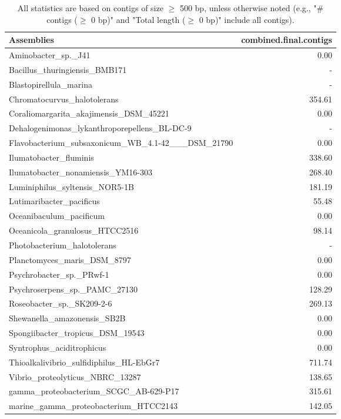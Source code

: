 \documentclass[12pt,a4paper]{article}
\begin{document}
\begin{table}[ht]
\begin{center}
\caption{All statistics are based on contigs of size $\geq$ 500 bp, unless otherwise noted (e.g., "\# contigs ($\geq$ 0 bp)" and "Total length ($\geq$ 0 bp)" include all contigs).}
\begin{tabular}{|l*{1}{|r}|}
\hline
Assemblies & combined.final.contigs \\ \hline
Aminobacter\_sp.\_J41 & 0.00 \\ \hline
Bacillus\_thuringiensis\_BMB171 & - \\ \hline
Blastopirellula\_marina & - \\ \hline
Chromatocurvus\_halotolerans & 354.61 \\ \hline
Coraliomargarita\_akajimensis\_DSM\_45221 & 0.00 \\ \hline
Dehalogenimonas\_lykanthroporepellens\_BL-DC-9 & - \\ \hline
Flavobacterium\_subsaxonicum\_WB\_4.1-42\_\_\_DSM\_21790 & 0.00 \\ \hline
Ilumatobacter\_fluminis & 338.60 \\ \hline
Ilumatobacter\_nonamiensis\_YM16-303 & 268.40 \\ \hline
Luminiphilus\_syltensis\_NOR5-1B & 181.19 \\ \hline
Lutimaribacter\_pacificus & 55.48 \\ \hline
Oceanibaculum\_pacificum & 0.00 \\ \hline
Oceanicola\_granulosus\_HTCC2516 & 98.14 \\ \hline
Photobacterium\_halotolerans & - \\ \hline
Planctomyces\_maris\_DSM\_8797 & 0.00 \\ \hline
Psychrobacter\_sp.\_PRwf-1 & 0.00 \\ \hline
Psychroserpens\_sp.\_PAMC\_27130 & 128.29 \\ \hline
Roseobacter\_sp.\_SK209-2-6 & 269.13 \\ \hline
Shewanella\_amazonensis\_SB2B & 0.00 \\ \hline
Spongiibacter\_tropicus\_DSM\_19543 & 0.00 \\ \hline
Syntrophus\_aciditrophicus & 0.00 \\ \hline
Thioalkalivibrio\_sulfidiphilus\_HL-EbGr7 & 711.74 \\ \hline
Vibrio\_proteolyticus\_NBRC\_13287 & 138.65 \\ \hline
gamma\_proteobacterium\_SCGC\_AB-629-P17 & 315.61 \\ \hline
marine\_gamma\_proteobacterium\_HTCC2143 & 142.05 \\ \hline
\end{tabular}
\end{center}
\end{table}
\end{document}
